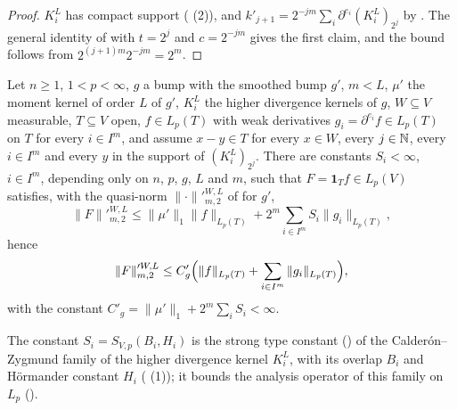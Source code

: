 \begin{proof}
\leanok
$K^L_i$ has compact support ( (2)), and
$k'_{j+1} = 2^{-jm} \sum_i \partial^{e_i} (K^L_i)_{2^j}$ by . The
general identity of  with $t = 2^j$ and $c = 2^{-jm}$ gives
the first claim, and the bound follows from $2^{(j+1)m} 2^{-jm} = 2^m$.
\end{proof}

\begin{theorem}
\label{thm:tl-local-means-higher}
\leanok
{}
Let $n \geq 1$, $1 < p < \infty$, $g$ a bump with the smoothed bump $g'$, $m < L$, $\mu'$ the
moment kernel of order $L$ of $g'$, $K^L_i$ the higher divergence kernels of $g$,
$W \subseteq V$ measurable,
$T \subseteq V$ open, $f \in L_p(T)$ with weak derivatives $g_i = \partial^{e_i} f \in L_p(T)$ on
$T$ for every $i \in I^m$, and assume $x - y \in T$ for every $x \in W$, every $j \in \mathbb{N}$, every
$i \in I^m$ and every $y$ in the support of $(K^L_i)_{2^j}$. There are constants $S_i < \infty$,
$i \in I^m$, depending only on $n$, $p$, $g$, $L$ and $m$, such that $F = \mathbf 1_T f \in L_p(V)$
satisfies, with the quasi-norm $\|\cdot\|'^{W,L}_{m,2}$ of  for $g'$,
\[
  \|F\|'^{W,L}_{m,2} \leq \|\mu'\|_1 \|f\|_{L_p(T)} + 2^m \sum_{i \in I^m} S_i \|g_i\|_{L_p(T)} ,
\]
hence
\[
  \|F\|'^{W,L}_{m,2} \leq C'_g \Bigl(\|f\|_{L_p(T)} + \sum_{i \in I^m} \|g_i\|_{L_p(T)}\Bigr) ,
\]
with the constant $C'_g = \|\mu'\|_1 + 2^m \sum_i S_i < \infty$.
\end{theorem}

The constant $S_i = S_{V,p}(B_i, H_i)$ is the strong type constant () of the
Calder\'on--Zygmund family of the higher divergence kernel $K^L_i$, with its overlap $B_i$ and
H\"ormander constant $H_i$ ( (1)); it bounds the analysis
operator of this family on $L_p$ ().


